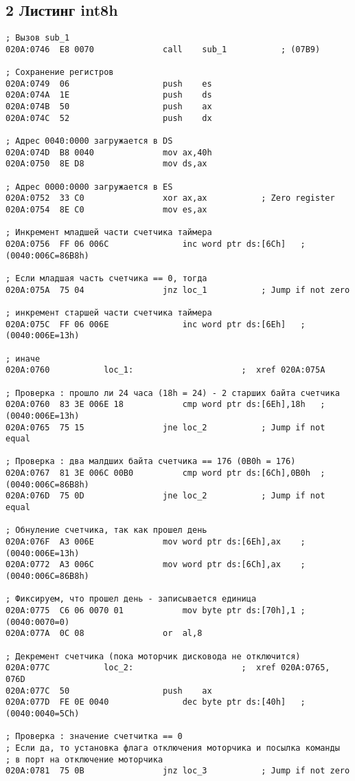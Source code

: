 \subsection*{2 Листинг int8h} 
\begin{lstlisting}[style={asm}]
; Вызов sub_1
020A:0746  E8 0070				call	sub_1			; (07B9)

; Сохранение регистров
020A:0749  06					push	es
020A:074A  1E					push	ds
020A:074B  50					push	ax
020A:074C  52					push	dx

; Адрес 0040:0000 загружается в DS
020A:074D  B8 0040				mov	ax,40h
020A:0750  8E D8				mov	ds,ax

; Адрес 0000:0000 загружается в ES
020A:0752  33 C0				xor	ax,ax			; Zero register
020A:0754  8E C0				mov	es,ax

; Инкремент младшей части счетчика таймера
020A:0756  FF 06 006C				inc	word ptr ds:[6Ch]	; (0040:006C=86B8h)

; Если младшая часть счетчика == 0, тогда
020A:075A  75 04				jnz	loc_1			; Jump if not zero

; инкремент старшей части счетчика таймера
020A:075C  FF 06 006E				inc	word ptr ds:[6Eh]	; (0040:006E=13h)

; иначе
020A:0760			loc_1:						;  xref 020A:075A

; Проверка : прошло ли 24 часа (18h = 24) - 2 старших байта счетчика
020A:0760  83 3E 006E 18			cmp	word ptr ds:[6Eh],18h	; (0040:006E=13h)
020A:0765  75 15				jne	loc_2			; Jump if not equal

; Проверка : два малдших байта счетчика == 176 (0B0h = 176)
020A:0767  81 3E 006C 00B0			cmp	word ptr ds:[6Ch],0B0h	; (0040:006C=86B8h)
020A:076D  75 0D				jne	loc_2			; Jump if not equal

; Обнуление счетчика, так как прошел день
020A:076F  A3 006E				mov	word ptr ds:[6Eh],ax	; (0040:006E=13h)
020A:0772  A3 006C				mov	word ptr ds:[6Ch],ax	; (0040:006C=86B8h)

; Фиксируем, что прошел день - записывается единица
020A:0775  C6 06 0070 01			mov	byte ptr ds:[70h],1	; (0040:0070=0)
020A:077A  0C 08				or	al,8

; Декремент счетчика (пока моторчик дисковода не отключится)
020A:077C			loc_2:						;  xref 020A:0765, 076D
020A:077C  50					push	ax
020A:077D  FE 0E 0040				dec	byte ptr ds:[40h]	; (0040:0040=5Ch)

; Проверка : значение счетчитка == 0
; Если да, то установка флага отключения моторчика и посылка команды
; в порт на отключение моторчика
020A:0781  75 0B				jnz	loc_3			; Jump if not zero


\end{lstlisting}
